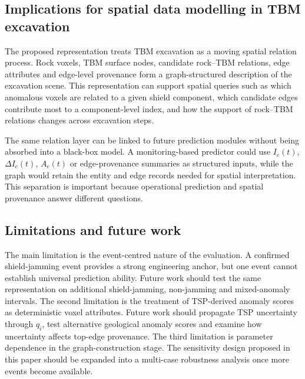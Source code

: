 \subsection{Implications for spatial data modelling in TBM excavation}
The proposed representation treats TBM excavation as a moving spatial relation process. Rock voxels, TBM surface nodes, candidate rock--TBM relations, edge attributes and edge-level provenance form a graph-structured description of the excavation scene. This representation can support spatial queries such as which anomalous voxels are related to a given shield component, which candidate edges contribute most to a component-level index, and how the support of rock--TBM relations changes across excavation steps.

The same relation layer can be linked to future prediction modules without being absorbed into a black-box model. A monitoring-based predictor could use $I_c(t)$, $\Delta I_c(t)$, $A_c(t)$ or edge-provenance summaries as structured inputs, while the graph would retain the entity and edge records needed for spatial interpretation. This separation is important because operational prediction and spatial provenance answer different questions.

\subsection{Limitations and future work}
The main limitation is the event-centred nature of the evaluation. A confirmed shield-jamming event provides a strong engineering anchor, but one event cannot establish universal prediction ability. Future work should test the same representation on additional shield-jamming, non-jamming and mixed-anomaly intervals. The second limitation is the treatment of TSP-derived anomaly scores as deterministic voxel attributes. Future work should propagate TSP uncertainty through $q_i$, test alternative geological anomaly scores and examine how uncertainty affects top-edge provenance. The third limitation is parameter dependence in the graph-construction stage. The sensitivity design proposed in this paper should be expanded into a multi-case robustness analysis once more events become available.
